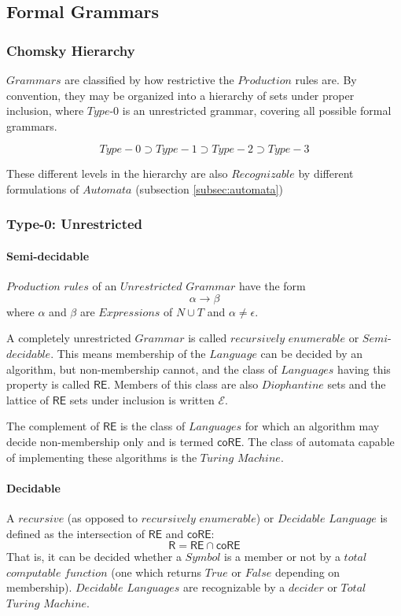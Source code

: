 \documentclass{article}
\begin{document}
\subsection{Formal Grammars}

\subsubsection{Chomsky Hierarchy}

$Grammars$ are classified by how restrictive the $Production$ rules
are. By convention, they may be organized into a hierarchy of sets
under proper inclusion, where $Type$-$0$ is an unrestricted grammar,
covering all possible formal grammars.

\[
    Type-0 \supset Type-1 \supset Type-2 \supset Type-3
\]

These different levels in the hierarchy are also $Recognizable$ by
different formulations of $Automata$ (subsection \ref{subsec:automata})

\subsubsection{Type-0: Unrestricted}

\paragraph{Semi-decidable}
$Production$ $rules$ of an $Unrestricted$ $Grammar$ have the form
\[
    \alpha \rightarrow \beta
\]
where $\alpha$ and $\beta$ are $Expressions$ of $N \cup T$ and $\alpha
\neq \epsilon$.

A completely unrestricted $Grammar$ is called $recursively$
$enumerable$ or $Semi$-$decidable$. This means membership of the
$Language$ can be decided by an algorithm, but non-membership cannot,
and the class of $Languages$ having this property is called
$\mathsf{RE}$. Members of this class are also $Diophantine$ sets and
the lattice of $\mathsf{RE}$ sets under inclusion is written
$\mathcal{E}$. %

The complement of $\mathsf{RE}$ is the class of $Languages$ for which
an algorithm may decide non-membership only and is termed
$\mathsf{coRE}$. The class of automata capable of implementing these
algorithms is the $Turing$ $Machine$.

\paragraph{Decidable}
A $recursive$ (as opposed to $recursively$ $enumerable$) or
$Decidable$ $Language$ is defined as the intersection of $\mathsf{RE}$
and $\mathsf{coRE}$:
\[
    \mathsf{R} = \mathsf{RE} \cap \mathsf{coRE}
\]
That is, it can be decided whether a $Symbol$ is a member or not by a
$total$ $computable$ $function$ (one which returns $True$ or $False$
depending on membership). $Decidable$ $Languages$ are recognizable by
a $decider$ or $Total$ $Turing$ $Machine$.
\end{document}
